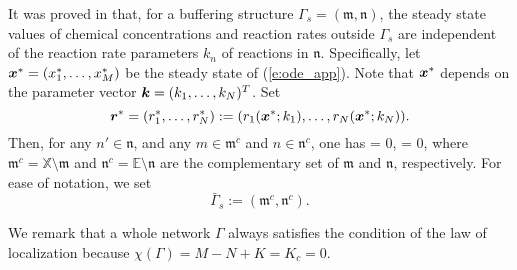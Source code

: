 \documentclass[ amsmath,amssymb,nofootinbib
]{revtex4-1}
\def\bal#1\eal{\begin{align}#1\end{align}}
\def\mbf#1{\mbox{\boldmath $#1$}}
\newcommand{\bx}{{\mbf x}}
\newcommand{\br}{{\mbf r}}
\newcommand{\p}{\partial}
\begin{document}
%




It was proved in \cite{OM} that, for a buffering structure  $\Gamma_s = (\mathfrak m, \mathfrak n)$,
 the steady state values of chemical concentrations and reaction rates  outside $\Gamma_s$ are independent of the reaction rate parameters $k_n$
 of reactions in $\mathfrak n$.
 Specifically, let $\bx^*=(x_1^*,\ldots,x_M^*)$ be the steady state of (\ref{e:ode_app}).
 Note that $\bx^*$ depends on the parameter vector ${\mbf k}=(k_1,\ldots,k_N)^T$.
Set
$$
\br^*=(r_1^*,\ldots,r_N^*):=(r_1(\bx^*;k_1),\ldots,r_N(\bx^*;k_N)).
$$
Then, for any $n'  \in  \mathfrak n$, and any $m \in \mathfrak m^c$
and $n \in \mathfrak n^c$,
one has
\bal
\frac{\p x_m^*}{\p k_{n'}} = 0, \;\;   \frac{\p  r_{n}^*}{\p k_{n'}} = 0, \label{lol}
\eal
where $\mathfrak m^c = \mathbb X \setminus \mathfrak m$
and $\mathfrak n^c = \mathbb E \setminus \mathfrak n$
are the complementary set of $\mathfrak m$ and $\mathfrak n$, respectively.
For ease of notation, we set
$$
       \bar \Gamma_s :=  (\mathfrak m^c, \mathfrak n^c).
$$

We remark that a whole network $\Gamma$ always satisfies the condition of the law of localization because $\chi(\Gamma) =M -N + K = K_c =0$.

\end{document}
